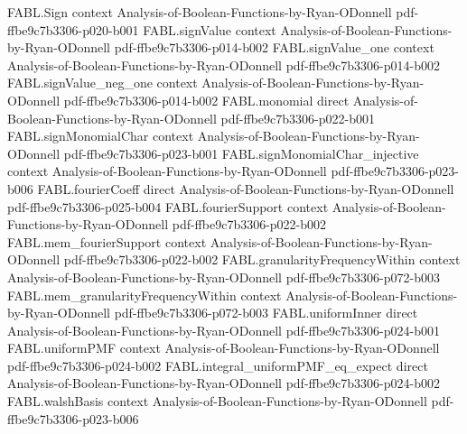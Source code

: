 \begin{theorem}
\label{FABL.productSingleCoordinateNoiseOperator_semigroup}
\leanok
{}
\proofstep
  {FABL.Sign}
  {context}
  {Analysis-of-Boolean-Functions-by-Ryan-ODonnell}
  {pdf-ffbe9c7b3306-p020-b001}
\proofstep
  {FABL.signValue}
  {context}
  {Analysis-of-Boolean-Functions-by-Ryan-ODonnell}
  {pdf-ffbe9c7b3306-p014-b002}
\proofstep
  {FABL.signValue_one}
  {context}
  {Analysis-of-Boolean-Functions-by-Ryan-ODonnell}
  {pdf-ffbe9c7b3306-p014-b002}
\proofstep
  {FABL.signValue_neg_one}
  {context}
  {Analysis-of-Boolean-Functions-by-Ryan-ODonnell}
  {pdf-ffbe9c7b3306-p014-b002}
\proofstep
  {FABL.monomial}
  {direct}
  {Analysis-of-Boolean-Functions-by-Ryan-ODonnell}
  {pdf-ffbe9c7b3306-p022-b001}
\proofstep
  {FABL.signMonomialChar}
  {context}
  {Analysis-of-Boolean-Functions-by-Ryan-ODonnell}
  {pdf-ffbe9c7b3306-p023-b001}
\proofstep
  {FABL.signMonomialChar_injective}
  {context}
  {Analysis-of-Boolean-Functions-by-Ryan-ODonnell}
  {pdf-ffbe9c7b3306-p023-b006}
\proofstep
  {FABL.fourierCoeff}
  {direct}
  {Analysis-of-Boolean-Functions-by-Ryan-ODonnell}
  {pdf-ffbe9c7b3306-p025-b004}
\proofstep
  {FABL.fourierSupport}
  {context}
  {Analysis-of-Boolean-Functions-by-Ryan-ODonnell}
  {pdf-ffbe9c7b3306-p022-b002}
\proofstep
  {FABL.mem_fourierSupport}
  {context}
  {Analysis-of-Boolean-Functions-by-Ryan-ODonnell}
  {pdf-ffbe9c7b3306-p022-b002}
\proofstep
  {FABL.granularityFrequencyWithin}
  {context}
  {Analysis-of-Boolean-Functions-by-Ryan-ODonnell}
  {pdf-ffbe9c7b3306-p072-b003}
\proofstep
  {FABL.mem_granularityFrequencyWithin}
  {context}
  {Analysis-of-Boolean-Functions-by-Ryan-ODonnell}
  {pdf-ffbe9c7b3306-p072-b003}
\proofstep
  {FABL.uniformInner}
  {direct}
  {Analysis-of-Boolean-Functions-by-Ryan-ODonnell}
  {pdf-ffbe9c7b3306-p024-b001}
\proofstep
  {FABL.uniformPMF}
  {context}
  {Analysis-of-Boolean-Functions-by-Ryan-ODonnell}
  {pdf-ffbe9c7b3306-p024-b002}
\proofstep
  {FABL.integral_uniformPMF_eq_expect}
  {direct}
  {Analysis-of-Boolean-Functions-by-Ryan-ODonnell}
  {pdf-ffbe9c7b3306-p024-b002}
\proofstep
  {FABL.walshBasis}
  {context}
  {Analysis-of-Boolean-Functions-by-Ryan-ODonnell}
  {pdf-ffbe9c7b3306-p023-b006}

\end{theorem}
